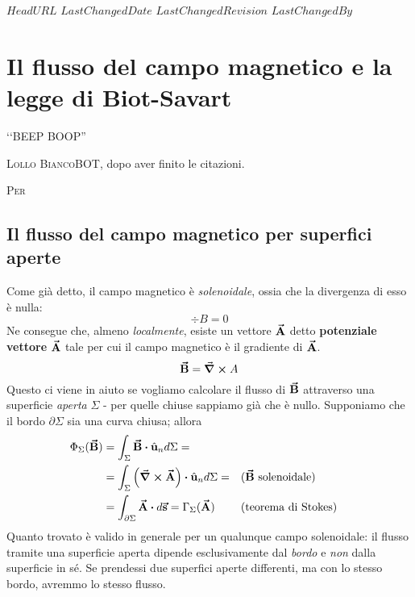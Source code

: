 \svnidlong
{$HeadURL$}
{$LastChangedDate$}
{$LastChangedRevision$}
{$LastChangedBy$}

\chapter{Il flusso del campo magnetico e la legge di Biot-Savart}

\begin{introduction}
	‘‘BEEP BOOP''
	\begin{flushright}
		\textsc{Lollo BiancoBOT}, dopo aver finito le citazioni. %
	\end{flushright}
\end{introduction}
\lettrine[findent=1pt, nindent=0pt]{P}{er}  %

\section{Il flusso del campo magnetico per superfici aperte}
Come già detto, il campo magnetico è \textit{solenoidale}, ossia che la divergenza di esso è nulla:
\begin{equation*}
	\div{B}=0
\end{equation*}
Ne consegue che, almeno \textit{localmente}, esiste un vettore $\vb*{\va{A}}$ detto \textbf{potenziale vettore} $\vb*{\va{A}}$ tale per cui il campo magnetico è il gradiente di $\vb*{\va{A}}$.
\begin{equation}
	\vb*{\va{B}}=\curl{A}
\end{equation}
Questo ci viene in aiuto se vogliamo calcolare il flusso di $\vb*{\va{B}}$ attraverso una superficie \textit{aperta} $\Sigma$ - per quelle chiuse sappiamo già che è nullo. Supponiamo che il bordo $\partial \Sigma$ sia una curva chiusa; allora
\begin{align*}
	\Phi_{\Sigma}(\vba{B})&=\int_{\Sigma}\vba{B}\vdot\vbh{u}_nd\Sigma=\\
	&=\int_{\Sigma}\left(\curl{\vba{A}}\right)\vdot\vbh{u}_nd\Sigma=&&\text{(}\vba{B}\ \text{solenoidale)}\\
	&=\int_{\partial \Sigma}\vba{A}\vdot d\vba{s}=\Gamma_{\Sigma}(\vba{A})&&\text{(teorema di Stokes)}
\end{align*}
Quanto trovato è valido in generale per un qualunque campo solenoidale: il flusso tramite una superficie aperta dipende esclusivamente dal \textit{bordo} e \textit{non} dalla superficie in sé. Se prendessi due superfici aperte differenti, ma con lo stesso bordo, avremmo lo stesso flusso.

